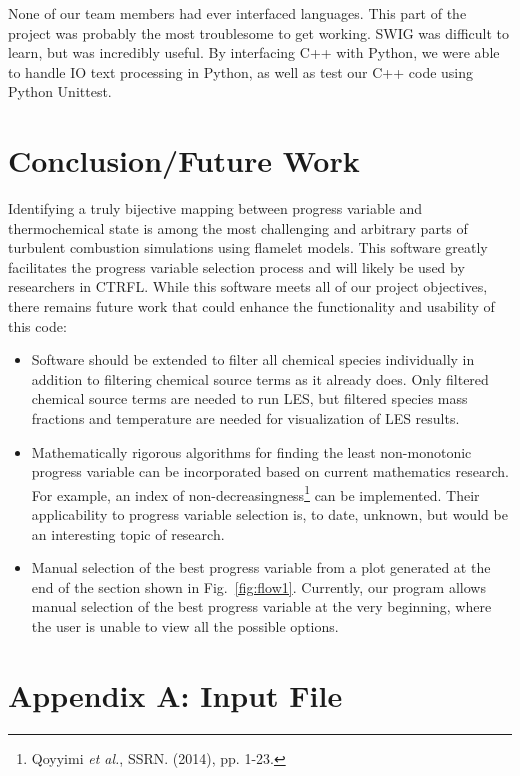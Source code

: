 \documentclass[11pt]{article}
\begin{document}
None of our team members had ever interfaced languages. This part of
the project was probably the most troublesome to get working. SWIG was
difficult to learn, but was incredibly useful. By interfacing C++ with
Python, we were able to handle IO text processing in Python, as well
as test our C++ code using Python Unittest.

\section{Conclusion/Future Work}
Identifying a truly bijective mapping between progress variable and
thermochemical state is among the most challenging and arbitrary parts
of turbulent combustion simulations using flamelet models. This
software greatly facilitates the progress variable selection process
and will likely be used by researchers in CTRFL. While this software
meets all of our project objectives, there remains future work that
could enhance the functionality and usability of this code:

\begin{itemize}
\item Software should be extended to filter all chemical species
  individually in addition to filtering chemical source terms as it
  already does. Only filtered chemical source terms are needed to run
  LES, but filtered species mass fractions and temperature are needed
  for visualization of LES results.
\item Mathematically rigorous algorithms for finding the least
  non-monotonic progress variable can be incorporated based on current
  mathematics research. For example, an index of
  non-decreasingness\footnote{Qoyyimi \textit{et al.}, SSRN. (2014),
    pp. 1-23.} can be implemented. Their applicability to progress
  variable selection is, to date, unknown, but would be an interesting
  topic of research.
\item Manual selection of the best progress variable from a plot
  generated at the end of the section shown in
  Fig.~\ref{fig:flow1}. Currently, our program allows manual selection
  of the best progress variable at the very beginning, where the user
  is unable to view all the possible options.
\end{itemize}


\clearpage
\section*{Appendix A: Input File}
\end{document}

